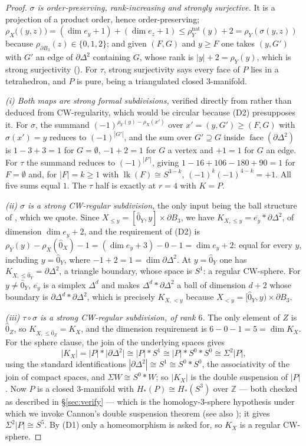 \documentclass[11pt]{amsart}
\theoremstyle{definition}
\theoremstyle{remark}
\newcommand{\face}{\operatorname{face}}
\newcommand{\lk}{\operatorname{lk}}
\newcommand{\Ohat}{\widehat{0}}
\newcommand{\bd}{\partial}
\newcommand{\join}{*}
\begin{document}
\begin{proof}
\emph{$\sigma$ is order-preserving, rank-increasing and strongly surjective.} It is a
projection of a product order, hence order-preserving; $\rho_X\bigl((y,z)\bigr)
=(\dim e_y+1)+(\dim e_z+1)\le\rho_Y^{\mathrm{nat}}(y)+2=\rho_Y(\sigma(y,z))$ because
$\rho_{\bd B_3}(z)\in\{0,1,2\}$; and given $(F,G)$ and $y\ge F$ one takes $(y,G')$ with
$G'$ an edge of $\bd\Delta^2$ containing $G$, whose rank is $|y|+2=\rho_Y(y)$, which is
strong surjectivity (\cite[Definition 3.1]{Stapledon}). For
$\tau$, strong surjectivity says every face of $P$ lies in a tetrahedron, and $P$ is
pure, being a triangulated closed $3$-manifold.

\emph{(i) Both maps are strong formal subdivisions,} verified directly from
\cite[Definition 3.5]{Stapledon} rather than deduced from CW-regularity, which would be
circular because (D2) presupposes it. For $\sigma$, the summand
$(-1)^{\rho_Y(y)-\rho_X(x')}$ over $x'=(y,G')\ge(F,G)$ with $\sigma(x')=y$ reduces to
$(-1)^{|G'|}$, and the sum over $G'\supseteq G$ inside $\face(\bd\Delta^2)$ is
$1-3+3=1$ for $G=\emptyset$, $-1+2=1$ for $G$ a vertex and $+1=1$ for $G$ an edge. For
$\tau$ the summand reduces to $(-1)^{|F'|}$, giving $1-16+106-180+90=1$ for
$F=\emptyset$ and, for $|F|=k\ge1$ with $\lk(F)\cong S^{3-k}$,
$(-1)^k(-1)^{4-k}=+1$. All five sums equal $1$. The $\tau$ half is exactly
\cite[Example 7.17]{Stapledon} at $r=4$ with $K=P$.

\emph{(ii) $\sigma$ is a strong CW-regular subdivision,} the only input being the ball
structure of \cite[Example 7.10]{Stapledon}, which we quote. Since
$X_{\le y}=[\Ohat_Y,y]\times\bd B_3$, we have
$K_{X,\le y}=\overline{e_y}\join\bd\Delta^2$, of dimension $\dim e_y+2$, and the
requirement of (D2) is $\rho_Y(y)-\rho_X(\Ohat_X)-1=(\dim e_y+3)-0-1=\dim e_y+2$: equal
for every $y$, including $y=\Ohat_Y$, where $-1+2=1=\dim\bd\Delta^2$. At $y=\Ohat_Y$ one
has $K_{X,\le\Ohat_Y}=\bd\Delta^2$, a triangle boundary, whose space is $S^1$: a regular
CW-sphere. For $y\ne\Ohat_Y$, $\overline{e_y}$ is a simplex $\Delta^d$ and
\cite[Example 7.10]{Stapledon} makes
$\Delta^d\join\bd\Delta^2$ a ball of dimension $d+2$ whose boundary is
$\bd\Delta^d\join\bd\Delta^2$, which is precisely $K_{X,<y}$ because
$X_{<y}=[\Ohat_Y,y)\times\bd B_3$.

\emph{(iii) $\tau\circ\sigma$ is a strong CW-regular subdivision, of rank $6$.} The only
element of $Z$ is $\Ohat_Z$, so $K_{X,\le\Ohat_Z}=K_X$, and the dimension requirement is
$6-0-1=5=\dim K_X$. For the sphere clause, the join of the underlying spaces gives
\[
 |K_X|=|P|\join\bigl|\bd\Delta^2\bigr|\cong|P|\join S^1\cong|P|\join S^0\join S^0
 \cong\Sigma^2|P| ,
\]
using the standard identifications $|\bd\Delta^2|\cong S^1\cong S^0\join S^0$, the
associativity of the join of compact spaces, and $\Sigma W\cong S^0\join W$; so $|K_X|$
is the double suspension of $|P|$. Now $P$ is a closed $3$-manifold with
$H_*(P)\cong H_*(S^3)$ over $\mathbb Z$ --- both checked as described in
\S\ref{sec:verify} --- which is the homology-$3$-sphere hypothesis under which we invoke
Cannon's double suspension theorem \cite{Cannon} (see also \cite{Edwards}); it gives
$\Sigma^2|P|\cong S^5$. By (D1) only a homeomorphism is asked for, so $K_X$ is a regular
CW-sphere.


\end{proof}
\end{document}
